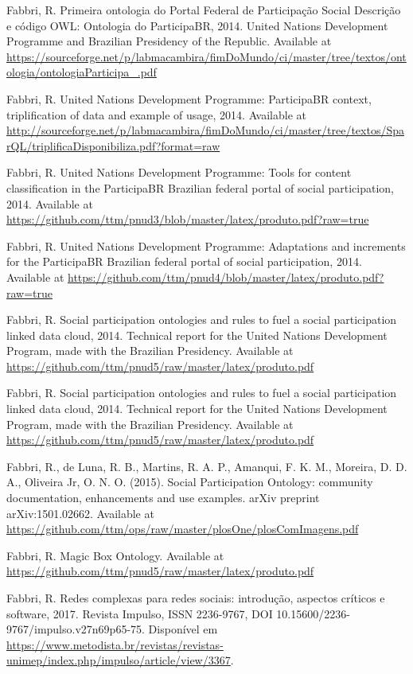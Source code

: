 \documentclass[letterpaper,10pt]{article}
\begin{document}
\begin{thebibliography}{99}
	Fabbri, R. Primeira ontologia do Portal Federal de Participação Social Descrição e código OWL: Ontologia do ParticipaBR, 2014.
    United Nations Development Programme and Brazilian Presidency of the Republic. Available at \url{https://sourceforge.net/p/labmacambira/fimDoMundo/ci/master/tree/textos/ontologia/ontologiaParticipa\_.pdf}

    Fabbri, R. United Nations Development Programme: ParticipaBR context, triplification of data and example of usage, 2014.
    Available at \url{http://sourceforge.net/p/labmacambira/fimDoMundo/ci/master/tree/textos/SparQL/triplificaDisponibiliza.pdf?format=raw}

    Fabbri, R. United Nations Development Programme: Tools for content classification in the ParticipaBR Brazilian federal portal of social participation, 2014.
    Available at \url{https://github.com/ttm/pnud3/blob/master/latex/produto.pdf?raw=true}

    Fabbri, R. United Nations Development Programme: Adaptations and increments for the ParticipaBR Brazilian federal portal of social participation, 2014.
    Available at \url{https://github.com/ttm/pnud4/blob/master/latex/produto.pdf?raw=true}

Fabbri, R. Social participation ontologies and rules to fuel a social participation linked data cloud, 2014.
	Technical report for the United Nations Development Program, made with the Brazilian Presidency.
		Available at \url{https://github.com/ttm/pnud5/raw/master/latex/produto.pdf}

Fabbri, R. Social participation ontologies and rules to fuel a social participation linked data cloud, 2014.
	Technical report for the United Nations Development Program, made with the Brazilian Presidency.
		Available at \url{https://github.com/ttm/pnud5/raw/master/latex/produto.pdf}

	Fabbri, R., de Luna, R. B., Martins, R. A. P., Amanqui, F. K. M., Moreira, D. D. A., Oliveira Jr, O. N. O. (2015). Social Participation Ontology: community documentation, enhancements and use examples. arXiv preprint arXiv:1501.02662. Available at \url{https://github.com/ttm/ops/raw/master/plosOne/plosComImagens.pdf}

	Fabbri, R. Magic Box Ontology.
		Available at \url{https://github.com/ttm/pnud5/raw/master/latex/produto.pdf}

	Fabbri, R. Redes complexas para redes sociais: introdução, aspectos críticos e software, 2017.
		Revista Impulso,
		ISSN 2236-9767,
		DOI 10.15600/2236-9767/impulso.v27n69p65-75.
		Disponível em
		\url{https://www.metodista.br/revistas/revistas-unimep/index.php/impulso/article/view/3367}.


\end{thebibliography}
\end{document}

